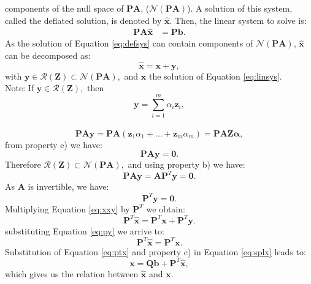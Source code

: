 \documentclass[12pt]{article}
\begin{document}
components of the null space of $\mathbf{P}\mathbf{A}$, ($\mathcal{N}(\mathbf{P}\mathbf{A})$). A solution of this system, called the deflated
solution, is denoted by $\mathbf{\hat{x}}$. Then, the linear system to solve is:\\
\begin{align}\label{eq:defsys}
\mathbf{P}\mathbf{A}\hat{\mathbf{x}}&=\mathbf{P}\mathbf{b}.
\end{align}
As the solution of Equation \eqref{eq:defsys} can contain components of 
$\mathcal{N}(\mathbf{P}\mathbf{A})$,
$\mathbf{\hat{x}}$ can be decomposed as:
\begin{equation}\label{eq:xxy}
\mathbf{\hat{x}}=\mathbf{x}+ \mathbf{y},
\end{equation}
with $\mathbf{y} \in \mathcal{R}(\mathbf{Z})\subset \mathcal{N}(\mathbf{P}\mathbf{A}),$ 
and $\mathbf{x}$ the solution of Equation \eqref{eq:linsys}.\\
Note: If $\mathbf{y} \in \mathcal{R}(\mathbf{Z}),$ then $$\mathbf{y}=\sum^{m}_{i=1}\alpha_i \mathbf{z}_i,$$\\
 \begin{equation*}\label{eq:paz}
 \mathbf{P}\mathbf{A}\mathbf{y} =\mathbf{P}\mathbf{A}(\mathbf{z}_1\alpha_1 +...+ \mathbf{z}_m\alpha_m)=\mathbf{P}\mathbf{A}\mathbf{Z}\mathbf{\alpha},\end{equation*}
 from property e) we have:
 \begin{equation*}\label{eq:pay}
 \mathbf{P}\mathbf{A}\mathbf{y}=\mathbf{0}.
 \end{equation*}
Therefore $\mathcal{R}(\mathbf{Z})\subset \mathcal{N}(\mathbf{P}\mathbf{A}),$ and using property b) we have:
 \begin{equation*}
 \mathbf{P}\mathbf{A}\mathbf{y}=\mathbf{A}\mathbf{P}^T\mathbf{y}=\mathbf{0}.
 \end{equation*}
 As $\mathbf{A}$ is invertible, we have:
  \begin{equation}\label{eq:py}
\mathbf{P}^T\mathbf{y}=\mathbf{0}.
 \end{equation}
 Multiplying Equation \eqref{eq:xxy} by $\mathbf{P}^T$ we obtain:
$$\mathbf{P}^T\mathbf{\hat{x}}=\mathbf{P}^T\mathbf{x}+\mathbf{P}^T\mathbf{y}.$$
substituting Equation \eqref{eq:py} we arrive to:
  \begin{equation}\label{eq:ptx}
\mathbf{P}^T\mathbf{\hat{x}}=\mathbf{P}^T\mathbf{x}.
 \end{equation}
Substitution of Equation \eqref{eq:ptx} and property c) in Equation \eqref{eq:splx} leads to:
\begin{equation}\label{eq:xfromxh1}
    \mathbf{x}=\mathbf{Q}\mathbf{b}+\mathbf{P}^T\mathbf{\hat{x}}, 
\end{equation}
which gives us the relation between $\mathbf{\hat{x}}$ and $\mathbf{x}$.
\newpage
\end{document}
